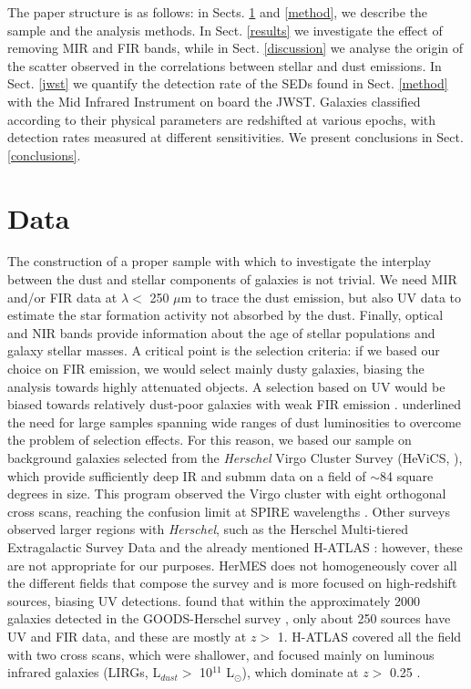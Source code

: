 \documentclass{aa}
\begin{document}
The paper structure is as follows: in Sects. \ref{sample} and \ref{method}, we describe the sample and the analysis methods. In Sect. \ref{results} we investigate the effect of removing MIR and FIR bands, while in Sect. \ref{discussion} we analyse the origin of the scatter observed in the correlations between stellar and dust emissions. In Sect. \ref{jwst} we quantify the detection rate of the SEDs found  in Sect. \ref{method} with the Mid Infrared Instrument \citep[MIRI,][]{rie2,wri2} on board the JWST. Galaxies classified according to their physical parameters are redshifted at various epochs, with detection rates measured at different sensitivities. We present conclusions in Sect. \ref{conclusions}.

\section{Data}
\label{sample}

The construction of a proper sample with which to investigate the interplay between the dust and stellar components of galaxies is not trivial. We need MIR and/or FIR data at $\lambda <$ 250 $\mu$m to trace the dust emission, but also UV data to estimate the star formation activity not absorbed by the dust. Finally, optical and NIR bands provide information about the age of stellar populations and galaxy stellar masses. A critical point is the selection criteria: if we based our choice on FIR emission, we would select mainly dusty galaxies, biasing the analysis towards highly attenuated objects. A selection based on UV would be biased towards relatively dust-poor galaxies with weak FIR emission \citep{igl}. \cite{dun} underlined the need for large samples spanning wide ranges of dust luminosities to overcome the problem of selection effects. For this reason, we based our sample on background galaxies selected from the {\it Herschel} Virgo Cluster Survey (HeViCS, \citealt{dav2,dav1}), which provide sufficiently deep IR and submm data on a field of   $\sim$84 square degrees in size. This program observed the Virgo cluster with eight orthogonal cross scans, reaching the confusion limit at SPIRE wavelengths \citep[see][for details]{pap1}. Other surveys observed larger regions with {\it Herschel}, such as the Herschel Multi-tiered Extragalactic Survey Data \citep[HerMES, ][]{oli} and the already mentioned H-ATLAS \citep{eal}: however, these are not appropriate for our purposes. HerMES does not  homogeneously cover all the different fields that compose the survey and is more focused on high-redshift sources, biasing UV detections. \citealt{bua} found that within the approximately 2000 galaxies detected in the GOODS-Herschel survey \citep{elb}, only about 250 sources have UV and FIR data, and these are mostly at $z >$ 1. H-ATLAS covered all the field with two cross scans, which were shallower, and focused mainly on luminous infrared galaxies (LIRGs, L$_{dust} >$ 10$^{11}$ L$_\odot$), which dominate at $z >$ 0.25 \citep{smi,bou}.
\end{document}
